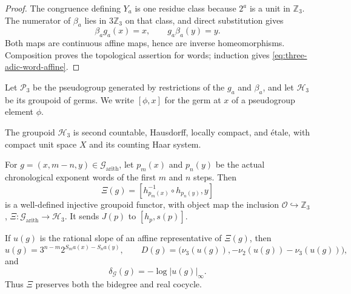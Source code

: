 \begin{proof}
The congruence defining $Y_a$ is one residue class because $2^a$ is a unit
in $\mathbb Z_3$.  The numerator of $\beta_a$ lies in $3\mathbb Z_3$ on
that class, and direct substitution gives
\[
 \beta_ag_a(x)=x,\qquad g_a\beta_a(y)=y.
\]
Both maps are continuous affine maps, hence are inverse homeomorphisms.
Composition proves the topological assertion for words; induction gives
\eqref{eq:three-adic-word-affine}.
\end{proof}

Let $\mathcal P_3$ be the pseudogroup generated by restrictions of the
$g_a$ and $\beta_a$, and let $\mathcal H_3$ be its groupoid of germs.  We
write $[\phi,x]$ for the germ at $x$ of a pseudogroup element $\phi$.

\begin{theorem}
\label{thm:three-adic-germ-functor}
The groupoid $\mathcal H_3$ is second countable, Hausdorff, locally compact,
and \'{e}tale, with compact unit space $X$ and its counting Haar system.

For $g=(x,m-n,y)\in\mathcal G_{\mathrm{arith}}$, let $p_m(x)$ and $p_n(y)$
be the actual chronological exponent words of the first $m$ and $n$ steps.
Then
\begin{equation}
\label{eq:arithmetic-to-germ-functor}
 \Xi(g)=
 \left[h_{p_m(x)}^{-1}\circ h_{p_n(y)},y\right]
\end{equation}
is a well-defined injective groupoid functor, with object map the inclusion
$\mathcal O\hookrightarrow\mathbb Z_3$,
$\Xi\colon\mathcal G_{\mathrm{arith}}\to\mathcal H_3$.  It sends
$J(p)$ to $[h_p,s(p)]$.

If $u(g)$ is the rational slope of an affine representative of $\Xi(g)$,
then
\begin{equation}
\label{eq:germ-slope-cocycles}
 u(g)=3^{n-m}2^{S_ma(x)-S_na(y)},\qquad
 D(g)=\bigl(\nu_3(u(g)),-\nu_2(u(g))-\nu_3(u(g))\bigr),
\end{equation}
and
\begin{equation}
\label{eq:germ-real-cocycle}
 \delta_{\mathcal G}(g)=-\log|u(g)|_{\infty}.
\end{equation}
Thus $\Xi$ preserves both the bidegree and real cocycle.
\end{theorem}

